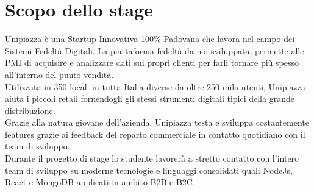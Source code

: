 \section*{Scopo dello stage}
Unipiazza è una Startup Innovativa 100\% Padovana che lavora nel campo dei Sistemi Fedeltà Digitali. La piattaforma fedeltà da noi sviluppata, permette alle PMI di acquisire e analizzare dati sui propri clienti per farli tornare più spesso all’interno del punto vendita.\\
Utilizzata in 350 locali in tutta Italia diverse da oltre 250 mila utenti, Unipiazza aiuta i piccoli retail fornendogli gli stessi strumenti digitali tipici della grande distribuzione.\\
Grazie alla natura giovane dell’azienda, Unipiazza testa e sviluppa costantemente features grazie ai feedback del reparto commerciale in contatto quotidiano con il team di sviluppo. \\
Durante il progetto di stage lo studente lavorerà a stretto contatto con l’intero team di sviluppo su moderne tecnologie e linguaggi consolidati quali NodeJs, React e MongoDB applicati in ambito B2B e B2C.